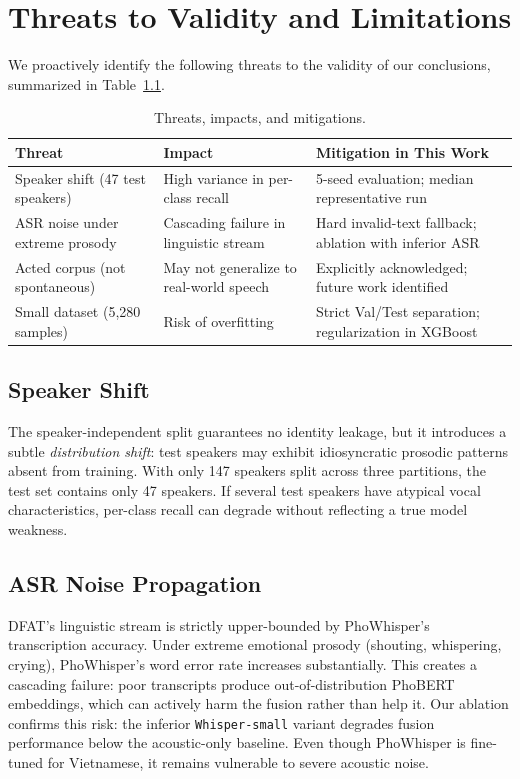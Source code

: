 \documentclass[12pt,a4paper]{report}
\begin{document}
\chapter{Threats to Validity and Limitations}
We proactively identify the following threats to the validity of our conclusions, summarized in Table~\ref{tab:threats}.

\begin{table}[h]
\centering
\small
\begin{tabular}{p{4cm}p{5cm}p{4cm}}
\toprule
\textbf{Threat} & \textbf{Impact} & \textbf{Mitigation in This Work} \\
\midrule
Speaker shift (47 test speakers) & High variance in per-class recall & 5-seed evaluation; median representative run \\
ASR noise under extreme prosody & Cascading failure in linguistic stream & Hard invalid-text fallback; ablation with inferior ASR \\
Acted corpus (not spontaneous) & May not generalize to real-world speech & Explicitly acknowledged; future work identified \\
Small dataset (5,280 samples) & Risk of overfitting & Strict Val/Test separation; regularization in XGBoost \\
\bottomrule
\end{tabular}
\caption{Threats, impacts, and mitigations.}
\label{tab:threats}
\end{table}

\section{Speaker Shift}
The speaker-independent split guarantees no identity leakage, but it introduces a subtle \textit{distribution shift}: test speakers may exhibit idiosyncratic prosodic patterns absent from training. With only 147 speakers split across three partitions, the test set contains only 47 speakers. If several test speakers have atypical vocal characteristics, per-class recall can degrade without reflecting a true model weakness.

\section{ASR Noise Propagation}
DFAT's linguistic stream is strictly upper-bounded by PhoWhisper's transcription accuracy. Under extreme emotional prosody (shouting, whispering, crying), PhoWhisper's word error rate increases substantially. This creates a cascading failure: poor transcripts produce out-of-distribution PhoBERT embeddings, which can actively harm the fusion rather than help it. Our ablation confirms this risk: the inferior \texttt{Whisper-small} variant degrades fusion performance below the acoustic-only baseline. Even though PhoWhisper is fine-tuned for Vietnamese, it remains vulnerable to severe acoustic noise.
\end{document}
